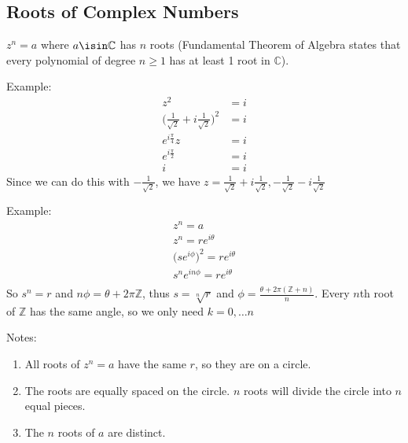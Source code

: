 \documentclass[12pt]{article}
\begin{document}
\subsection*{Roots of Complex Numbers}
$z^n = a$ where $a \isin \mathbb{C}$ has $n$ roots (Fundamental Theorem of Algebra states that every polynomial of degree $n \geq 1$ has at least 1 root in $\mathbb{C}$).

Example:
\begin{align*}
z^2 &= i\\
\bigg(\frac{1}{\sqrt{2}} + i\frac{1}{\sqrt{2}}\bigg)^2 &= i\\
e^{i\frac{\pi}{4}}z &= i\\
e^{i\frac{\pi}{2}} &= i\\
i &= i
\end{align*}
Since we can do this with $-\frac{1}{\sqrt{2}}$, we have $z = \frac{1}{\sqrt{2}} + i\frac{1}{\sqrt{2}}, -\frac{1}{\sqrt{2}} - i\frac{1}{\sqrt{2}}$

Example:
\begin{align*}
z^n = a\\
z^n = re^{i\theta}\\
\bigl(se^{i\phi}\bigl)^2 = re^{i\theta}\\
s^ne^{in\phi} = re^{i\theta}\\
\end{align*}
So $s^n = r$ and $n\phi = \theta + 2\pi\mathbb{Z}$, thus $s = \sqrt[n]{r}$ and $\phi = \frac{\theta + 2\pi(\mathbb{Z}+n)}{n}$. Every $n$th root of $\mathbb{Z}$ has the same angle, so we only need $k = 0,\dots n$

Notes:
\begin{enumerate}
\item All roots of $z^n =a$ have the same $r$, so they are on a circle.
\item The roots are equally spaced on the circle. $n$ roots will divide the circle into $n$ equal pieces.
\item The $n$ roots of $a$ are distinct.
\end{enumerate}
\end{document}
